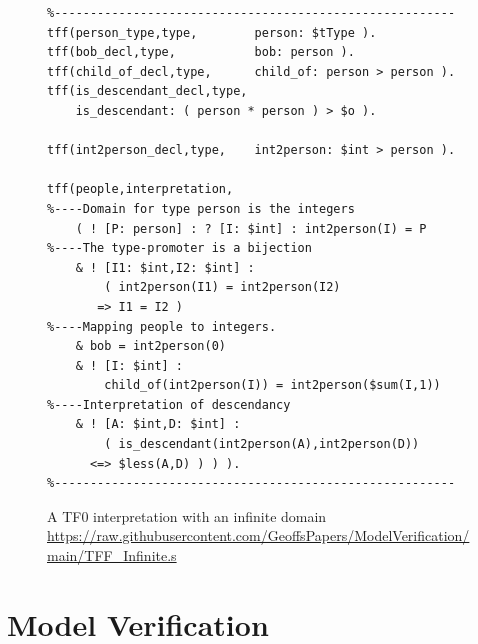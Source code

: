 \documentclass{easychair}
\begin{document}
\begin{figure}[htbp]
\small
{}
\begin{verbatim}
%--------------------------------------------------------
tff(person_type,type,        person: $tType ).
tff(bob_decl,type,           bob: person ).
tff(child_of_decl,type,      child_of: person > person ).
tff(is_descendant_decl,type, 
    is_descendant: ( person * person ) > $o ).

tff(int2person_decl,type,    int2person: $int > person ).

tff(people,interpretation,
%----Domain for type person is the integers
    ( ! [P: person] : ? [I: $int] : int2person(I) = P
%----The type-promoter is a bijection
    & ! [I1: $int,I2: $int] : 
        ( int2person(I1) = int2person(I2) 
       => I1 = I2 )
%----Mapping people to integers. 
    & bob = int2person(0)
    & ! [I: $int] : 
        child_of(int2person(I)) = int2person($sum(I,1))
%----Interpretation of descendancy
    & ! [A: $int,D: $int] : 
        ( is_descendant(int2person(A),int2person(D)) 
      <=> $less(A,D) ) ) ).
%--------------------------------------------------------
\end{verbatim}
\caption{A TF0 interpretation with an infinite domain\\
{\footnotesize \url{https://raw.githubusercontent.com/GeoffsPapers/ModelVerification/main/TFF_Infinite.s}}}
\label{TF0InfiniteInterpretation}
\end{figure}

\section{Model Verification}
\label{Verification}
\end{document}
